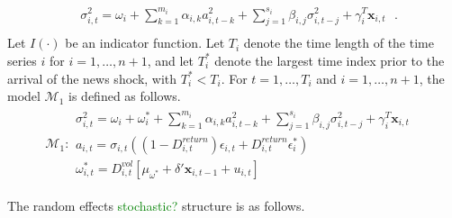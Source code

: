 \documentclass[11pt]{article}
\newcommand{\x}{\textbf{x}}
\def\mbf#1{\mathbf{#1}} %
\def\mc#1{\mathcal{#1}} %
\def\mc#1{\mathcal{#1}}
\theoremstyle{definition}
\begin{document}
\begin{align*}
&\sigma_{i,t}^{2} = \omega_{i} + \sum^{m_{i}}_{k=1}\alpha_{i,k}a^{2}_{i,t-k} + \sum_{j=1}^{s_{i}}\beta_{i,j}\sigma_{i,t-j}^{2} + \gamma_{i}^{T} \x_{i,t} \text{ }. \\
\end{align*}
Let $I(\cdot)$ be an indicator function.  Let $T_i$ denote the time length of the time series $i$ for $i = 1, \ldots, n+1$, and let $T_i^*$ denote the largest time index prior to the arrival of the news shock, with $T_i^* < T_i$.  For $t= 1, \ldots, T_i$ and $i = 1, \ldots, n+1$, the model $\mc{M}_1$ is defined as follows.  
\begin{align*}
  \mc{M}_1 \colon \begin{array}{l}
     \sigma^{2}_{i,t} = \omega_{i} + \omega^{*}_i + \sum^{m_{i}}_{k=1}\alpha_{i,k}a^{2}_{i,t-k} + \sum_{j=1}^{s_{i}}\beta_{i,j}\sigma_{i,t-j}^{2} + \gamma_{i}^{T} \x_{i,t} \text{ }\\[.2cm]
     a_{i,t} = \sigma_{i,t}((1-D^{return}_{i,t})\epsilon_{i,t} + D^{return}_{i,t}\epsilon^{*}_{i})\\[.2cm]
    \omega_{i,t}^{*} = D^{vol}_{i,t}[\mu_{\omega^{*}}+\delta'\mbf{x}_{i, t-1}+ u_{i,t}]
  \end{array}
  \end{align*}

  The random effects \textcolor{green}{stochastic?} structure is as follows.
\end{document}
